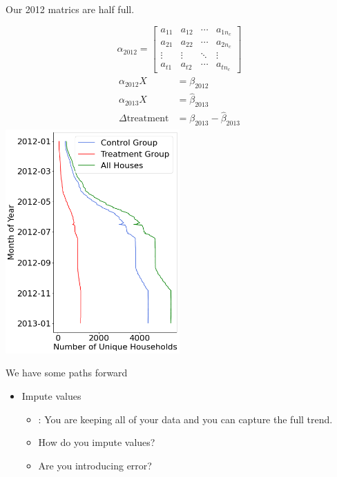 \documentclass{beamer}
\begin{document}
\begin{frame}{Our 2012 matrics are half full.}
  \begin{multicols}{2}
    $$
    \alpha_{2012} = \left[\begin{array}{cccc}
    a_{11} & a_{12} & \cdots & a_{1 n_c} \\
    a_{21} & a_{22} & \cdots & a_{2 n_c} \\
    \vdots & \vdots & \ddots & \vdots \\
    a_{t 1} & a_{t 2} & \cdots & a_{t n_c}
    \end{array}\right]
    $$
    \begin{align*}
      \begin{split}
          \alpha_{2012} X &= \beta_{2012} \\
          \alpha_{2013} X &= \hat\beta_{2013} \\
          \Delta\mbox{treatment} &= \beta_{2013} - \hat\beta_{2013}
      \end{split}
    \end{align*}
    \break
    \centering
    \includegraphics[width=0.5\textwidth]{images/unique-houses-2012.png}
  \end{multicols}
\end{frame}

\begin{frame}{We have some paths forward}
  \begin{itemize}
    \item<+-> Impute values
    \begin{itemize}
      \item<+-> {\color{green}{Pro}}: You are keeping all of your data and you can capture the full trend.
      \item<+-> How do you impute values?
      \item<+-> Are you introducing error?
    \end{itemize}
  \end{itemize}
\end{frame}
\end{document}
